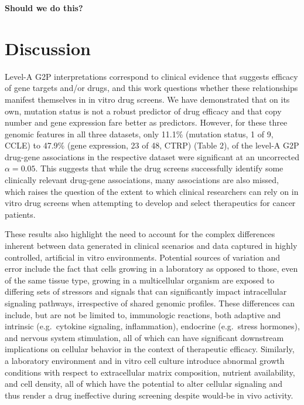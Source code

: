 \documentclass[man]{apa6}
\begin{document}
\textbf{Should we do this?}

\section{Discussion}\label{discussion}

Level-A G2P interpretations correspond to clinical evidence that
suggests efficacy of gene targets and/or drugs, and this work questions
whether these relationships manifest themselves in in vitro drug
screens. We have demonstrated that on its own, mutation status is not a
robust predictor of drug efficacy and that copy number and gene
expression fare better as predictors. However, for these three genomic
features in all three datasets, only 11.1\% (mutation status, 1 of 9,
CCLE) to 47.9\% (gene expression, 23 of 48, CTRP) (Table 2), of the
level-A G2P drug-gene associations in the respective dataset were
significant at an uncorrected \(\alpha = 0.05\). This suggests that
while the drug screens successfully identify some clinically relevant
drug-gene associations, many associations are also missed, which raises
the question of the extent to which clinical researchers can rely on in
vitro drug screens when attempting to develop and select therapeutics
for cancer patients.

These results also highlight the need to account for the complex
differences inherent between data generated in clinical scenarios and
data captured in highly controlled, artificial in vitro environments.
Potential sources of variation and error include the fact that cells
growing in a laboratory as opposed to those, even of the same tissue
type, growing in a multicellular organism are exposed to differing sets
of stressors and signals that can significantly impact intracellular
signaling pathways, irrespective of shared genomic profiles. These
differences can include, but are not be limited to, immunologic
reactions, both adaptive and intrinsic (e.g.~cytokine signaling,
inflammation), endocrine (e.g.~stress hormones), and nervous system
stimulation, all of which can have significant downstream implications
on cellular behavior in the context of therapeutic efficacy. Similarly,
a laboratory environment and in vitro cell culture introduce abnormal
growth conditions with respect to extracellular matrix composition,
nutrient availability, and cell density, all of which have the potential
to alter cellular signaling and thus render a drug ineffective during
screening despite would-be in vivo activity.
\end{document}
